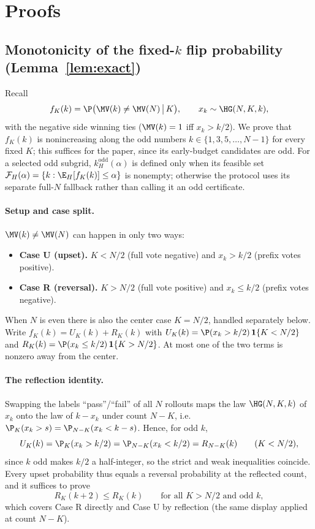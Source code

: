 \section{Proofs}
\label{app:proofs}

\subsection{Monotonicity of the fixed-$k$ flip probability (Lemma~\ref{lem:exact})}

Recall
\[
f_K(k)=\P\big(\MV(k)\neq\MV(N)\,\big|\,K\big),
\qquad x_k\sim\HG(N,K,k),
\]
with the negative side winning ties ($\MV(k)=1$ iff $x_k>k/2$).
We prove that $f_K(k)$ is nonincreasing along the odd numbers
$k\in\{1,3,5,\dots,N-1\}$ for every fixed $K$; this suffices for the paper,
since its early-budget candidates are odd. For a selected odd subgrid,
$k_H^{\mathrm{odd}}(\alpha)$ is defined only when its feasible set
$\mathcal F_H(\alpha)=\{k:\E_H[f_K(k)]\le\alpha\}$ is nonempty; otherwise
the protocol uses its separate full-$N$ fallback rather than calling it an odd
certificate.

\paragraph{Setup and case split.}
$\MV(k)\neq\MV(N)$ can happen in only two ways:
\begin{itemize}
\item \textbf{Case U (upset).} $K<N/2$ (full vote negative) and $x_k>k/2$
(prefix votes positive).
\item \textbf{Case R (reversal).} $K>N/2$ (full vote positive) and $x_k\le k/2$
(prefix votes negative).
\end{itemize}
When $N$ is even there is also the center case $K=N/2$, handled separately
below. Write $f_K(k)=U_K(k)+R_K(k)$ with $U_K(k)=\P(x_k>k/2)\,\mathbf 1\{K<N/2\}$
and $R_K(k)=\P(x_k\le k/2)\,\mathbf 1\{K>N/2\}$. At most one of the two terms
is nonzero away from the center.

\paragraph{The reflection identity.}
Swapping the labels ``pass''/``fail'' of all $N$ rollouts maps the law
$\HG(N,K,k)$ of $x_k$ onto the law of $k-x_k$ under count $N-K$, i.e.\
$\P_{K}(x_k>s)=\P_{N-K}(x_k<k-s)$. Hence, for odd $k$,
\[
U_K(k)=\P_K(x_k>k/2)=\P_{N-K}(x_k<k/2)=R_{N-K}(k)
\qquad(K<N/2),
\]
since $k$ odd makes $k/2$ a half-integer, so the strict and weak
inequalities coincide. Every upset probability thus equals a reversal
probability at the reflected count, and it suffices to prove
\begin{equation}
\label{eq:revmain}
R_K(k+2)\le R_K(k)\qquad\text{for all }K>N/2\text{ and odd }k,
\end{equation}
which covers Case R directly and Case U by reflection (the same display
applied at count $N-K$).

